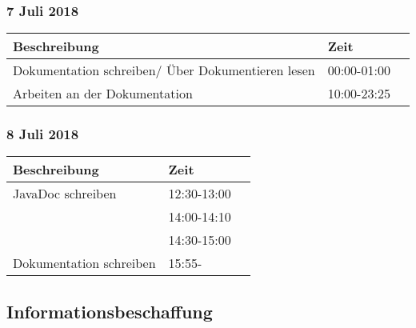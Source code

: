 \documentclass[a4paper, 11pt]{article}
\begin{document}
\subsubsection{7 Juli 2018}

\begin{tabular}{llr}
\toprule
Beschreibung & Zeit \\
\midrule
Dokumentation schreiben/ Über Dokumentieren lesen & 00:00-01:00 \\
Arbeiten an der Dokumentation & 10:00-23:25 \\
\bottomrule
\end{tabular}

\subsubsection{8 Juli 2018}

\begin{tabular}{llr}
\toprule
Beschreibung & Zeit \\
\midrule
JavaDoc schreiben & 12:30-13:00 \\
 & 14:00-14:10 \\
 & 14:30-15:00\\
Dokumentation schreiben & 15:55- \\
\bottomrule
\end{tabular}

\subsection{Informationsbeschaffung}
\end{document}
